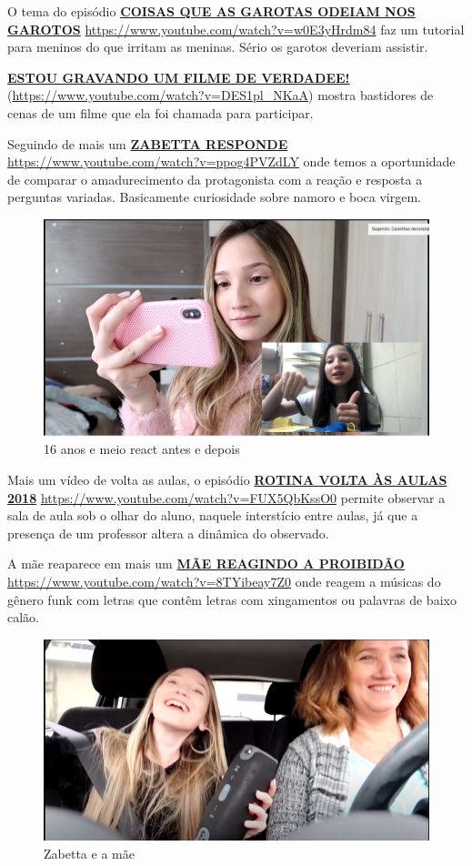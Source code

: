 O tema do episódio \href{https://www.youtube.com/watch?v=w0E3yHrdm84}{\textbf{COISAS QUE AS GAROTAS ODEIAM NOS GAROTOS}} \url{https://www.youtube.com/watch?v=w0E3yHrdm84} faz um tutorial para meninos do que irritam as meninas. Sério os garotos deveriam assistir.

\href{https://www.youtube.com/watch?v=DES1pl_NKaA}{\textbf{ESTOU GRAVANDO UM FILME DE VERDADEE!}} (\url{https://www.youtube.com/watch?v=DES1pl_NKaA}) mostra bastidores de cenas de um filme que ela foi chamada para participar.

Seguindo de mais um \href{https://www.youtube.com/watch?v=ppog4PVZdLY}{\textbf{ZABETTA RESPONDE}} \url{https://www.youtube.com/watch?v=ppog4PVZdLY} onde temos a oportunidade de comparar o amadurecimento da protagonista com a reação e resposta a perguntas variadas. Basicamente curiosidade sobre namoro e boca virgem.

\begin{figure}[h!]
    \centering
    \includegraphics[width=0.7\linewidth]{fig/Zabetta-16-anos3-antes-depois}
    \caption{16 anos  e meio react antes e depois}
    \label{fig:zabetta-16-anos3-antes-depois}
\end{figure}

Mais um vídeo de volta as aulas, o episódio \href{https://www.youtube.com/watch?v=FUX5QbKssO0}{\textbf{ROTINA VOLTA ÀS AULAS 2018}} \url{https://www.youtube.com/watch?v=FUX5QbKssO0} permite observar a sala de aula sob o olhar do aluno, naquele interstício entre aulas, já que a presença de um professor altera a dinâmica do observado.

A mãe reaparece em mais um \href{https://www.youtube.com/watch?v=8TYibeay7Z0}{\textbf{MÃE REAGINDO A PROIBIDÃO}} \url{https://www.youtube.com/watch?v=8TYibeay7Z0} onde reagem a músicas do gênero funk com letras que contêm letras com xingamentos ou palavras de baixo calão.

\begin{figure}[h!]
    \centering
    \includegraphics[width=0.7\linewidth]{fig/Zabetta-16-anos-mae}
    \caption{Zabetta e a mãe}
    \label{fig:zabetta-16-anos-mae}
\end{figure}



